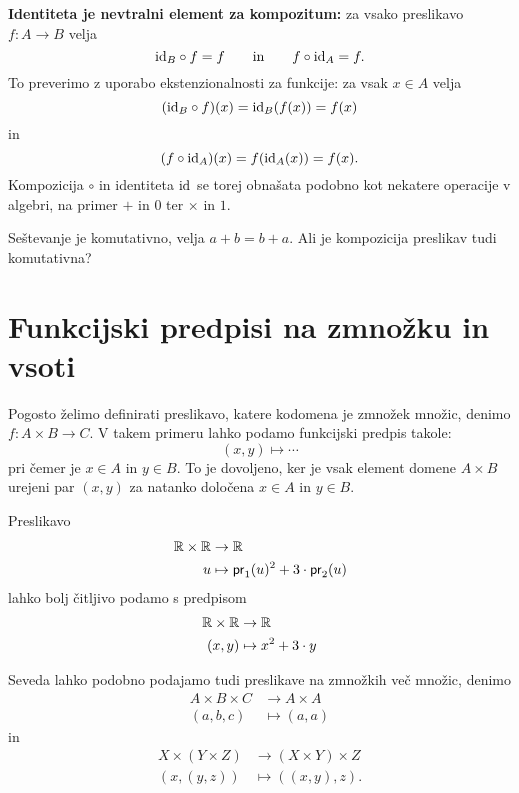 \textbf{Identiteta je nevtralni element za kompozitum:} za vsako preslikavo $f : A \to B$ velja
%
\begin{equation*}
  \id[B] \circ f = f
  \iinn
  f \circ \id[A] = f.
\end{equation*}
%
To preverimo z uporabo ekstenzionalnosti za funkcije: za vsak $x \in A$ velja
%
\begin{equation*}
    (\id[B] \circ f)(x) = \id[B] (f(x)) = f(x)
\end{equation*}
%
in
\begin{equation*}
  (f \circ \id[A])(x) = f (\id[A](x)) = f(x).
\end{equation*}
%
Kompozicija $\circ$ in identiteta $\id$ se torej obnašata podobno kot nekatere operacije v algebri, na primer $+$ in $0$ ter $×$ in $1$.

\begin{naloga}
  Seštevanje je komutativno, velja $a + b = b + a$. Ali je kompozicija preslikav tudi komutativna?
\end{naloga}

\section{Funkcijski predpisi na zmnožku in vsoti}

Pogosto želimo definirati preslikavo, katere kodomena je zmnožek množic, denimo $f : A \times B \to C$. V takem primeru lahko
podamo funkcijski predpis takole:
%
\begin{equation*}
  (x, y) \mapsto \cdots
\end{equation*}
%
pri čemer je $x \in A$ in $y \in B$. To je dovoljeno, ker je vsak element domene $A \times B$ urejeni par $(x, y)$ za natanko določena $x \in A$ in $y \in B$.

\begin{primer}

Preslikavo
%
\begin{align*}
  \RR \times \RR  &\to  \RR \\
  u &\mapsto  \fst(u)^2 + 3 \cdot \snd(u)
\end{align*}
%
lahko bolj čitljivo podamo s predpisom
%
\begin{align*}
  \RR \times \RR  &\to  \RR \\
  (x, y) &\mapsto  x^2 + 3 \cdot y
\end{align*}
\end{primer}

\begin{primer}
  Seveda lahko podobno podajamo tudi preslikave na zmnožkih več množic, denimo
  \begin{align*}
  A \times B \times C &\to A \times A \\
  (a, b, c) &\mapsto (a, a)
  \end{align*}
  in
  \begin{align*}
  X \times (Y \times Z) &\to (X \times Y) \times Z \\
  (x, (y, z)) &\mapsto ((x, y), z).
  \end{align*}
\end{primer}

